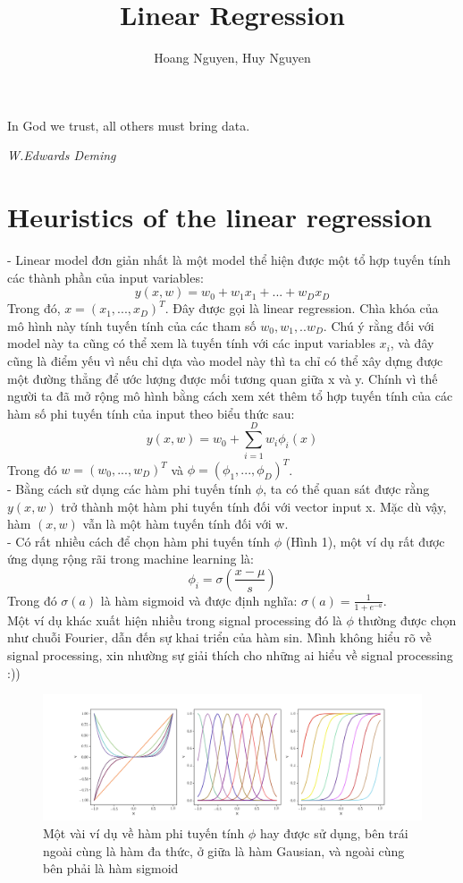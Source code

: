\documentclass[10pt]{article}
\begin{document}
\title{Linear Regression}
\author{Hoang Nguyen, Huy Nguyen}
\maketitle

\epigraph{In God we trust, all others must bring data.}{\textit{W.Edwards Deming}}

\section{Heuristics of the linear regression}
- Linear model đơn giản nhất là một model thể hiện được một tổ hợp tuyến tính   các thành phần của input variables:
\[ y(x,w) = w_0 + w_1x_1 + ... +w_Dx_D \]
Trong đó, $x = (x_1, ...,x_D)^{T}$. Đây được gọi là linear regression. Chìa khóa của mô hình này tính tuyến tính của các tham số $w_0, w_1,..w_D$. Chú ý rằng đối với model này ta cũng có thể xem là tuyến tính với các input variables $x_i$, và đây cũng là điểm yếu vì nếu chỉ dựa vào model này thì ta chỉ có thể xây dựng được một đường thẳng để ước lượng được mối tương quan giữa x và y. Chính vì thế người ta đã mở rộng mô hình bằng cách xem xét thêm tổ hợp tuyến tính của các hàm số phi tuyến tính của input theo biểu thức sau:
\[ y(x, w) = w_0 + \sum_{i=1}^{D}w_i\phi_{i}(x) \]
Trong đó $w=(w_0,...,w_{D})^{T}$ và $\phi=(\phi_1,...,\phi_{D})^{T}$.\\
- Bằng cách sử dụng các hàm phi tuyến tính $\phi$, ta có thể quan sát được rằng $y(x,w)$ trở thành một hàm phi tuyến tính đối với vector input x. Mặc dù vậy, hàm $(x,w)$ vẫn là một hàm tuyến tính đối với w.\\
- Có rất nhiều cách để chọn hàm phi tuyến tính $\phi$ (Hình 1), một ví dụ rất được ứng dụng rộng rãi trong machine learning là:
\[ \phi_{i}=\sigma(\frac{x-\mu}{s}) \]
Trong đó $\sigma(a)$ là hàm sigmoid và được định nghĩa: $\sigma(a) = \frac{1}{1 + e^{-a}}$.\\
Một ví dụ khác xuất hiện nhiều trong signal processing đó là $\phi$ thường được chọn như chuỗi Fourier, dẫn đến sự khai triển của hàm sin. Mình không hiểu rõ về signal processing, xin nhường sự giải thích cho những ai hiểu về signal processing :))
\begin{figure}
  \includegraphics[width=\linewidth]{kernel.png}
  \caption{Một vài ví dụ về hàm phi tuyến tính $\phi$ hay được sử dụng, bên trái ngoài cùng là hàm đa thức, ở giữa là hàm Gausian, và ngoài cùng bên phải là hàm sigmoid}
  \label{fig:boat1}
\end{figure}
\end{document}
